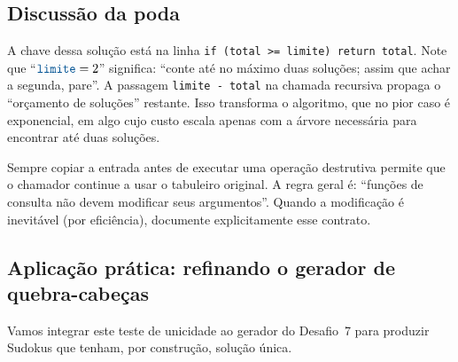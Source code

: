 \documentclass[11pt,a4paper,oneside]{report}
\newcommand{\codigo}[1]{\texttt{\color{deitelblue}#1}}
\begin{document}
\subsection{Discussão da poda}

A chave dessa solução está na linha \codigo{if (total >= limite) return total}.
Note que ``$\codigo{limite} = 2$'' significa: ``conte até no máximo duas
soluções; assim que achar a segunda, pare''. A passagem
\codigo{limite - total} na chamada recursiva propaga o ``orçamento de
soluções'' restante. Isso transforma o algoritmo, que no pior caso é
exponencial, em algo cujo custo escala apenas com a árvore necessária
para encontrar até duas soluções.

\begin{boapratica}
Sempre copiar a entrada antes de executar uma operação destrutiva
permite que o chamador continue a usar o tabuleiro original. A regra
geral é: ``funções de consulta não devem modificar seus argumentos''.
Quando a modificação é inevitável (por eficiência), documente
explicitamente esse contrato.
\end{boapratica}

\subsection{Aplicação prática: refinando o gerador de quebra-cabeças}

Vamos integrar este teste de unicidade ao gerador do Desafio~7 para
produzir Sudokus que tenham, por construção, solução única.
\end{document}
